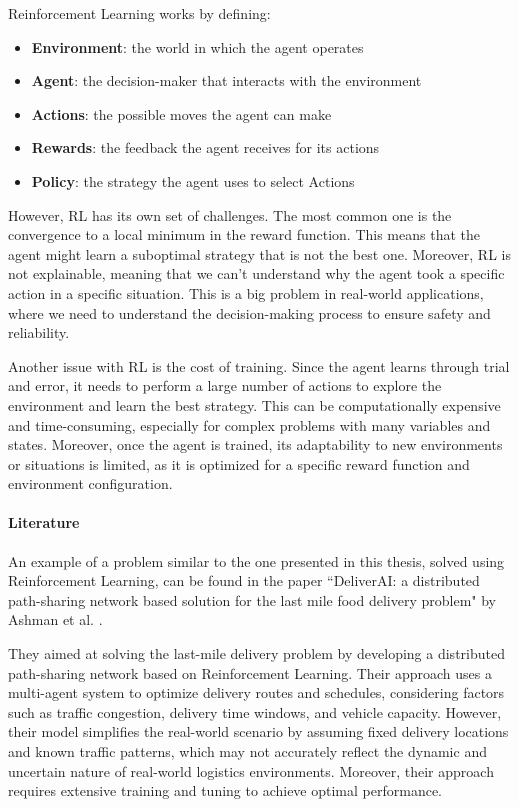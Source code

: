 Reinforcement Learning works by defining:
\begin{itemize}
  \item \textbf{Environment}: the world in which the agent operates

  \item \textbf{Agent}: the decision-maker that interacts with the environment

  \item \textbf{Actions}: the possible moves the agent can make

  \item \textbf{Rewards}: the feedback the agent receives for its actions

  \item \textbf{Policy}: the strategy the agent uses to select Actions
\end{itemize}

However, RL has its own set of challenges. The most common one is the
convergence to a local minimum in the reward function. This means that the agent
might learn a suboptimal strategy that is not the best one. Moreover, RL is not explainable,
meaning that we can't understand why the agent took a specific action in a
specific situation. This is a big problem in real-world applications, where we
need to understand the decision-making process to ensure safety and reliability.

Another issue with RL is the cost of training. Since the agent learns through trial
and error, it needs to perform a large number of actions to explore the
environment and learn the best strategy. This can be computationally expensive and
time-consuming, especially for complex problems with many variables and states. Moreover,
once the agent is trained, its adaptability to new environments or situations is
limited, as it is optimized for a specific reward function and environment
configuration.

\paragraph{Literature}
An example of a problem similar to the one presented in this thesis, solved
using Reinforcement Learning, can be found in the paper ``DeliverAI: a
distributed path-sharing network based solution for the last mile food delivery
problem" by Ashman et al. \cite{mehra2024deliveraireinforcementlearningbased}.

They aimed at solving the last-mile delivery problem by developing a distributed
path-sharing network based on Reinforcement Learning. Their approach uses a multi-agent
system to optimize delivery routes and schedules, considering factors such as
traffic congestion, delivery time windows, and vehicle capacity. However, their
model simplifies the real-world scenario by assuming fixed delivery locations
and known traffic patterns, which may not accurately reflect the dynamic and uncertain
nature of real-world logistics environments. Moreover, their approach requires extensive
training and tuning to achieve optimal performance.

